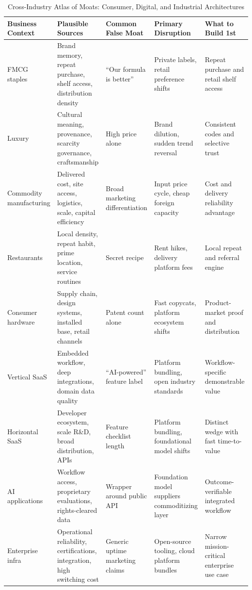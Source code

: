 \begin{table}[t]
\centering
\footnotesize
\caption{Cross-Industry Atlas of Moats: Consumer, Digital, and Industrial Architectures}
\label{tab:atlas_consumer_digital}
\begin{tabularx}{\textwidth}{p{2.3cm} p{3.2cm} p{2.4cm} p{2.6cm} X}
\toprule
\textbf{Business Context} & \textbf{Plausible Sources} & \textbf{Common False Moat} & \textbf{Primary Disruption} & \textbf{What to Build 1st} \\
\midrule
FMCG staples & Brand memory, repeat purchase, shelf access, distribution density & ``Our formula is better'' & Private labels, retail preference shifts & Repeat purchase and retail shelf access \\
\addlinespace[3pt]
Luxury & Cultural meaning, provenance, scarcity governance, craftsmanship & High price alone & Brand dilution, sudden trend reversal & Consistent codes and selective trust \\
\addlinespace[3pt]
Commodity manufacturing & Delivered cost, site access, logistics, scale, capital efficiency & Broad marketing differentiation & Input price cycle, cheap foreign capacity & Cost and delivery reliability advantage \\
\addlinespace[3pt]
Restaurants & Local density, repeat habit, prime location, service routines & Secret recipe & Rent hikes, delivery platform fees & Local repeat and referral engine \\
\addlinespace[3pt]
Consumer hardware & Supply chain, design systems, installed base, retail channels & Patent count alone & Fast copycats, platform ecosystem shifts & Product-market proof and distribution \\
\addlinespace[3pt]
Vertical SaaS & Embedded workflow, deep integrations, domain data quality & ``AI-powered'' feature label & Platform bundling, open industry standards & Workflow-specific demonstrable value \\
\addlinespace[3pt]
Horizontal SaaS & Developer ecosystem, scale R\&D, broad distribution, APIs & Feature checklist length & Platform bundling, foundational model shifts & Distinct wedge with fast time-to-value \\
\addlinespace[3pt]
AI applications & Workflow access, proprietary evaluations, rights-cleared data & Wrapper around public API & Foundation model suppliers commoditizing layer & Outcome-verifiable integrated workflow \\
\addlinespace[3pt]
Enterprise infra & Operational reliability, certifications, integration, high switching cost & Generic uptime marketing claims & Open-source tooling, cloud platform bundles & Narrow mission-critical enterprise use case \\

\end{tabularx}
\end{table}
